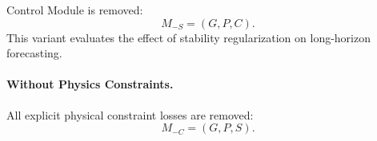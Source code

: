 Control Module is removed: \begin{equation} M_{-S} = (G,P,C). \end{equation} This variant evaluates the effect of stability regularization on long-horizon forecasting. \paragraph{Without Physics Constraints.} All explicit physical constraint losses are removed: \begin{equation} M_{-C} = (G,P,S). \end{equation} %